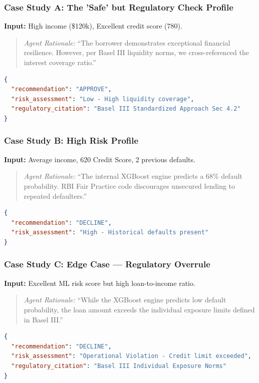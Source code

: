 \documentclass[12pt, a4paper]{article}
\begin{document}
\subsubsection{Case Study A: The 'Safe' but Regulatory Check Profile}
\textbf{Input:} High income (\$120k), Excellent credit score (780).
\begin{quote}
\textit{Agent Rationale:} ``The borrower demonstrates exceptional financial resilience. However, per Basel III liquidity norms, we cross-referenced the interest coverage ratio.''
\end{quote}
\begin{lstlisting}[language=json]
{
  "recommendation": "APPROVE",
  "risk_assessment": "Low - High liquidity coverage",
  "regulatory_citation": "Basel III Standardized Approach Sec 4.2"
}
\end{lstlisting}

\subsubsection{Case Study B: High Risk Profile}
\textbf{Input:} Average income, 620 Credit Score, 2 previous defaults.
\begin{quote}
\textit{Agent Rationale:} ``The internal XGBoost engine predicts a 68\% default probability. RBI Fair Practice code discourages unsecured lending to repeated defaulters.''
\end{quote}
\begin{lstlisting}[language=json]
{
  "recommendation": "DECLINE",
  "risk_assessment": "High - Historical defaults present"
}
\end{lstlisting}

\subsubsection{Case Study C: Edge Case --- Regulatory Overrule}
\textbf{Input:} Excellent ML risk score but high loan-to-income ratio.
\begin{quote}
\textit{Agent Rationale:} ``While the XGBoost engine predicts low default probability, the loan amount exceeds the individual exposure limits defined in Basel III.''
\end{quote}
\begin{lstlisting}[language=json]
{
  "recommendation": "DECLINE",
  "risk_assessment": "Operational Violation - Credit limit exceeded",
  "regulatory_citation": "Basel III Individual Exposure Norms"
}
\end{lstlisting}
\end{document}
